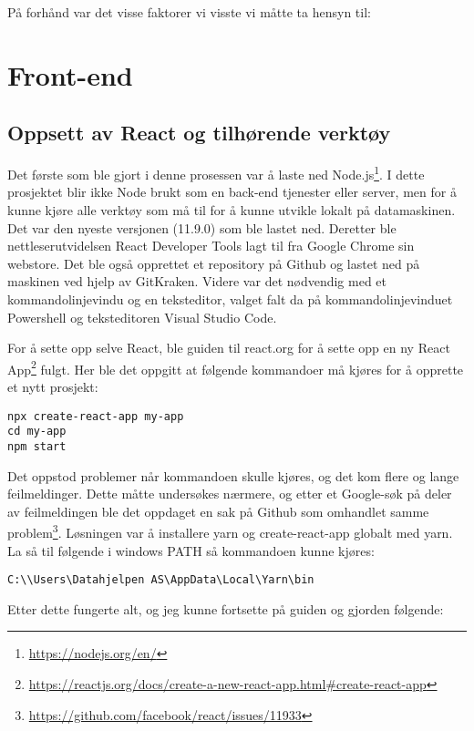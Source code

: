 \clearpage


På forhånd var det visse faktorer vi visste vi måtte ta hensyn til:


\section{Front-end}

\subsection{Oppsett av React og tilhørende verktøy}

Det første som ble gjort i denne prosessen var å laste ned Node.js\footnote{\url{https://nodejs.org/en/}}. I dette prosjektet blir ikke Node brukt som en back-end tjenester eller server, men for å kunne kjøre alle verktøy som må til for å kunne utvikle lokalt på datamaskinen. Det var den nyeste versjonen (11.9.0) som ble lastet ned. Deretter ble nettleserutvidelsen React Developer Tools lagt til fra Google Chrome sin webstore. Det ble også opprettet et repository på Github og lastet ned på maskinen ved hjelp av GitKraken. 
Videre var det nødvendig med et kommandolinjevindu og en teksteditor, valget falt da på kommandolinjevinduet Powershell og teksteditoren Visual Studio Code.

For å sette opp selve React, ble  guiden til react.org for å sette opp en ny React App\footnote{\url{https://reactjs.org/docs/create-a-new-react-app.html\#create-react-app}} fulgt. Her ble det oppgitt at følgende kommandoer må kjøres for å opprette et nytt prosjekt:
\begin{lstlisting}
npx create-react-app my-app
cd my-app
npm start
\end{lstlisting}

Det oppstod problemer når kommandoen  skulle kjøres, og det kom flere og lange feilmeldinger. Dette måtte undersøkes nærmere, og etter et Google-søk på deler av feilmeldingen ble det oppdaget en sak på Github som omhandlet samme problem\footnote{\url{https://github.com/facebook/react/issues/11933}}.
Løsningen var å installere yarn og create-react-app globalt med yarn. La så til følgende i windows PATH så kommandoen kunne kjøres:
\begin{lstlisting}
C:\\Users\Datahjelpen AS\AppData\Local\Yarn\bin
\end{lstlisting}
Etter dette fungerte alt, og jeg kunne fortsette på guiden og gjorden følgende:

